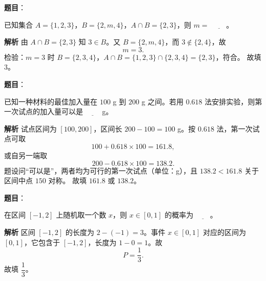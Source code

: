\begin{answer}

\textbf{题目}：

已知集合 $A=\{1,2,3\}$，$B=\{2,m,4\}$，$A\cap B=\{2,3\}$，则 $m=$ $\underline{\qquad}$。

\textbf{解析}
由 $A\cap B=\{2,3\}$ 知 $3\in B$。又 $B=\{2,m,4\}$，而 $3\notin\{2,4\}$，故
\nopagebreak[4]
\[m=3.\]
检验：$m=3$ 时 $B=\{2,3,4\}$，$A\cap B=\{1,2,3\}\cap\{2,3,4\}=\{2,3\}$，符合。
故填 $3$。


\end{answer}
\begin{answer}

\textbf{题目}：

已知一种材料的最佳加入量在 $100$ g 到 $200$ g 之间。若用 $0.618$ 法安排实验，则第一次试点的加入量可以是 $\underline{\qquad}$ g。

\textbf{解析}
试点区间为 $[100,200]$，区间长 $200-100=100$ g。按 $0.618$ 法，第一次试点可取
\nopagebreak[4]
\[100+0.618\times100=161.8,\]
或自另一端取
\nopagebreak[4]
\[200-0.618\times100=138.2.\]
题设问“可以是”，两者均为可行的第一次试点（单位：g），且 $138.2<161.8$ 关于区间中点 $150$ 对称。
故填 $161.8$ 或 $138.2$。


\end{answer}
\begin{answer}

\textbf{题目}：

在区间 $[-1,2]$ 上随机取一个数 $x$，则 $x\in[0,1]$ 的概率为 $\underline{\qquad}$。

\textbf{解析}
区间 $[-1,2]$ 的长度为 $2-(-1)=3$。事件 $x\in[0,1]$ 对应的区间为 $[0,1]$，它包含于 $[-1,2]$，长度为 $1-0=1$。故
\nopagebreak[4]
\[P=\frac{1}{3}.\]
故填 $\dfrac13$。


\end{answer}
